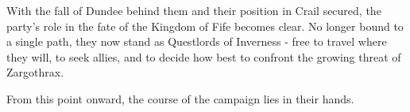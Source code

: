 	{}%
	{}%
	{}%
	{}%
	{}%
	{}%
	{}%
	{}%

{\entryfont With the fall of Dundee behind them and their position in Crail secured, the party's role in the fate of the Kingdom of Fife becomes clear. No longer bound to a single path, they now stand as Questlords of Inverness - free to travel where they will, to seek allies, and to decide how best to confront the growing threat of Zargothrax.

From this point onward, the course of the campaign lies in their hands.}

\vfill\eject


